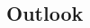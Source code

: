 \documentclass[12pt]{article}
\begin{document}
\begin{multicols}{2}
\section{Outlook}


\begin{thebibliography}{3}

	
        
    
\end{thebibliography}

    
\end{multicols}
\end{document}
